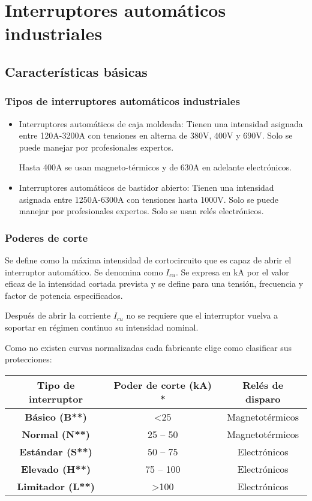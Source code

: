 \chapter{Interruptores automáticos industriales}
\section{Características básicas}
\subsection{Tipos de interruptores automáticos industriales}
\begin{itemize}
	\item Interruptores automáticos de caja moldeada:
			Tienen una intensidad asignada entre 120A-3200A con tensiones en alterna de 380V, 400V y 690V. Solo se puede manejar por profesionales expertos.
			\newline
			
			Hasta 400A se usan magneto-térmicos y de 630A en adelante electrónicos.
	\item Interruptores automáticos de bastidor abierto: Tienen una intensidad asignada entre 1250A-6300A con tensiones hasta 1000V. Solo se puede manejar por profesionales expertos. Solo se usan relés electrónicos.
\end{itemize}
\subsection{Poderes de corte}
Se define como la máxima intensidad de cortocircuito que es capaz de abrir el interruptor automático. Se denomina como $I_{cu}$. Se expresa en kA por el valor eficaz de la intensidad cortada prevista y se define para una tensión, frecuencia y factor de potencia especificados.
\newline

Después de abrir la corriente $I_{cu}$ no se requiere que el interruptor vuelva a soportar en régimen continuo su intensidad nominal.
\newline

Como no existen curvas normalizadas cada fabricante elige como clasificar sus protecciones:
\begin{table}[H]
	\centering
	\begin{tabular}{|c|c|c|}
		\hline
		\textbf{Tipo de interruptor} & \textbf{Poder de corte (kA) *} & \textbf{Relés de disparo} \\ \hline
		\textbf{Básico (B**)}        & \textless{}25                 & Magnetotérmicos           \\ \hline
		\textbf{Normal (N**)}        & 25 -- 50                      & Magnetotérmicos           \\ \hline
		\textbf{Estándar (S**)}      & 50 -- 75                      & Electrónicos              \\ \hline
		\textbf{Elevado (H**)}       & 75 -- 100                     & Electrónicos              \\ \hline
		\textbf{Limitador (L**)}     & \textgreater{}100             & Electrónicos              \\ \hline
	\end{tabular}
\end{table}
